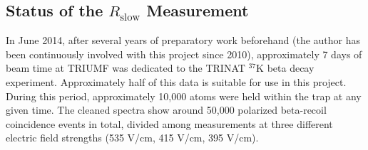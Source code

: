%
%

%
\subsection{Status of the $R_{\textrm{slow}}$ Measurement}
\label{rslow_status}
In June 2014, after several years of preparatory work beforehand (the author has been continuously involved with this project since 2010), approximately 7 days of beam time at TRIUMF was dedicated to the TRINAT $^{37}\textrm{K}$ beta decay experiment.  Approximately half of this data is suitable for use in this project.  During this period, approximately 10,000 atoms were held within the trap at any given time.  The cleaned spectra show around 50,000 polarized beta-recoil coincidence events in total, divided among measurements at three different electric field strengths (535 V/cm, 415 V/cm, 395 V/cm). 

